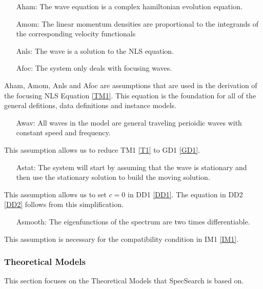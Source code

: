 \documentclass[12pt]{article}
\begin{document}
\begin{itemize}[leftmargin=.5in]

\item[Aham:]The 
wave equation is a complex hamiltonian evolution equation. 
\item[Amom:]The 
linear momentum densities are proportional to the integrands of the 
corresponding velocity functionals 
\item[Anls:]The 
wave is a solution to the NLS equation.
\item[Afoc:]The 
system only deals with focusing waves.
\end{itemize} 
Aham, Amom, Anls and Afoc are assumptions that are used in the derivation of 
the focusing NLS Equation \ref{TM1}. This equation is the foundation for all of 
the general defitions, data definitions and instance models. 

\begin{itemize}[leftmargin=.5in]
\item[Awav:]All 
waves in the model are general traveling perioidic waves with constant speed 
and frequency. 
\end{itemize} 

This assumption allows us to reduce TM1 \ref{T1} to GD1 \ref{GD1}.

\begin{itemize}[leftmargin=.5in]
	\item[Astat:] The system will start by assuming that the wave is stationary 
	and 
	then use 
	the stationary solution to build the moving solution.	
\end{itemize} 

This assumption allows us to set $c=0$ in DD1 \ref{DD1}. The equation in DD2 
\ref{DD2} follows from this simplification. 

\begin{itemize}[leftmargin=.5in]
	\item[Asmooth:] The eigenfunctions of the spectrum are two times 
	differentiable.
\end{itemize} 

This assumption is necessary for the compatibility condition in IM1 \ref{IM1}.

\newpage
\subsubsection{Theoretical Models}\label{sec_theoretical}

This section focuses on the Theoretical Models that SpecSearch is based
on. 
~\newline
\end{document}
